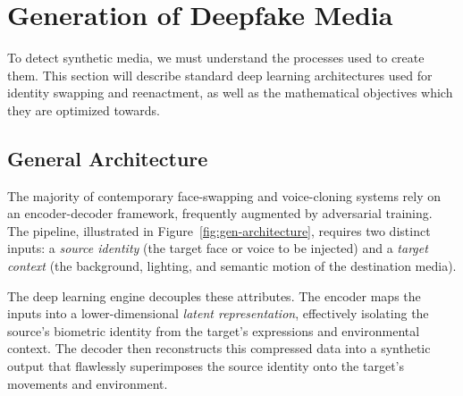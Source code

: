 \documentclass[a4paper,12pt]{article}
\begin{document}
\section{Generation of Deepfake Media}
\label{sec:generation}

To detect synthetic media, we must understand the processes used to create them. This section will describe standard deep learning architectures used for identity swapping and reenactment, as well as the mathematical objectives which they are optimized towards.
\subsection{General Architecture}
\label{subsec:gen-architecture}

The majority of contemporary face-swapping and voice-cloning systems rely on an encoder-decoder framework, frequently augmented by adversarial training. The pipeline, illustrated in Figure~\ref{fig:gen-architecture}, requires two distinct inputs: a \textit{source identity} (the target face or voice to be injected) and a \textit{target context} (the background, lighting, and semantic motion of the destination media). 

The deep learning engine decouples these attributes. The encoder maps the inputs into a lower-dimensional \textit{latent representation}, effectively isolating the source's biometric identity from the target's expressions and environmental context. The decoder then reconstructs this compressed data into a synthetic output that flawlessly superimposes the source identity onto the target's movements and environment.
\end{document}
